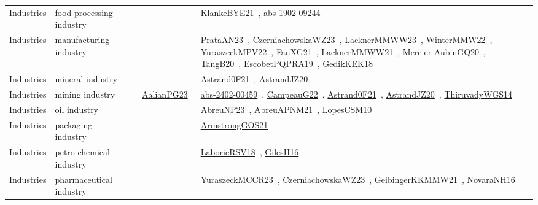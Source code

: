 {\begin{longtable}{lp{3cm}>{\raggedright\arraybackslash}p{6cm}>{\raggedright\arraybackslash}p{6cm}>{\raggedright\arraybackslash}p{8cm}}
Industries & food-processing industry &  &  & \href{works/KlankeBYE21.pdf}{KlankeBYE21}~\cite{KlankeBYE21}, \href{works/abs-1902-09244.pdf}{abs-1902-09244}~\cite{abs-1902-09244}\\
Industries & manufacturing industry &  &  & \href{works/PrataAN23.pdf}{PrataAN23}~\cite{PrataAN23}, \href{works/CzerniachowskaWZ23.pdf}{CzerniachowskaWZ23}~\cite{CzerniachowskaWZ23}, \href{works/LacknerMMWW23.pdf}{LacknerMMWW23}~\cite{LacknerMMWW23}, \href{works/WinterMMW22.pdf}{WinterMMW22}~\cite{WinterMMW22}, \href{works/YuraszeckMPV22.pdf}{YuraszeckMPV22}~\cite{YuraszeckMPV22}, \href{works/FanXG21.pdf}{FanXG21}~\cite{FanXG21}, \href{works/LacknerMMWW21.pdf}{LacknerMMWW21}~\cite{LacknerMMWW21}, \href{works/Mercier-AubinGQ20.pdf}{Mercier-AubinGQ20}~\cite{Mercier-AubinGQ20}, \href{works/TangB20.pdf}{TangB20}~\cite{TangB20}, \href{works/EscobetPQPRA19.pdf}{EscobetPQPRA19}~\cite{EscobetPQPRA19}, \href{works/GedikKEK18.pdf}{GedikKEK18}~\cite{GedikKEK18}\\
Industries & mineral industry &  &  & \href{works/Astrand0F21.pdf}{Astrand0F21}~\cite{Astrand0F21}, \href{works/AstrandJZ20.pdf}{AstrandJZ20}~\cite{AstrandJZ20}\\
Industries & mining industry &  & \href{works/AalianPG23.pdf}{AalianPG23}~\cite{AalianPG23} & \href{works/abs-2402-00459.pdf}{abs-2402-00459}~\cite{abs-2402-00459}, \href{works/CampeauG22.pdf}{CampeauG22}~\cite{CampeauG22}, \href{works/Astrand0F21.pdf}{Astrand0F21}~\cite{Astrand0F21}, \href{works/AstrandJZ20.pdf}{AstrandJZ20}~\cite{AstrandJZ20}, \href{works/ThiruvadyWGS14.pdf}{ThiruvadyWGS14}~\cite{ThiruvadyWGS14}\\
Industries & oil industry &  &  & \href{works/AbreuNP23.pdf}{AbreuNP23}~\cite{AbreuNP23}, \href{works/AbreuAPNM21.pdf}{AbreuAPNM21}~\cite{AbreuAPNM21}, \href{works/LopesCSM10.pdf}{LopesCSM10}~\cite{LopesCSM10}\\
Industries & packaging industry &  &  & \href{works/ArmstrongGOS21.pdf}{ArmstrongGOS21}~\cite{ArmstrongGOS21}\\
Industries & petro-chemical industry &  &  & \href{works/LaborieRSV18.pdf}{LaborieRSV18}~\cite{LaborieRSV18}, \href{works/GilesH16.pdf}{GilesH16}~\cite{GilesH16}\\
Industries & pharmaceutical industry &  &  & \href{works/YuraszeckMCCR23.pdf}{YuraszeckMCCR23}~\cite{YuraszeckMCCR23}, \href{works/CzerniachowskaWZ23.pdf}{CzerniachowskaWZ23}~\cite{CzerniachowskaWZ23}, \href{works/GeibingerKKMMW21.pdf}{GeibingerKKMMW21}~\cite{GeibingerKKMMW21}, \href{works/NovaraNH16.pdf}{NovaraNH16}~\cite{NovaraNH16}\\

\end{longtable}}
